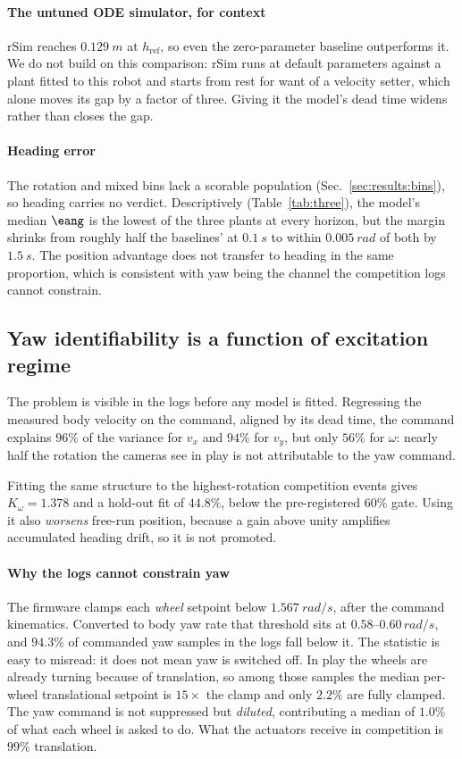 \paragraph{The untuned ODE simulator, for context}
rSim reaches $\SI{0.129}{m}$ at $h_{\mathrm{ref}}$, so even the zero-parameter
baseline outperforms it. We do not build on this comparison: rSim runs at
default parameters against a plant fitted to this robot and starts from rest for
want of a velocity setter, which alone moves its gap by a factor of three.
Giving it the model's dead time widens rather than closes the gap.

\paragraph{Heading error}
The rotation and mixed bins lack a scorable population
(Sec.~\ref{sec:results:bins}), so heading carries no verdict. Descriptively
(Table~\ref{tab:three}), the model's median $\eang$ is the lowest of the three
plants at every horizon, but the margin shrinks from roughly half the
baselines' at $\SI{0.1}{s}$ to within $\SI{0.005}{rad}$ of both by
$\SI{1.5}{s}$. The position advantage does not transfer to heading in the same
proportion, which is consistent with yaw being the channel the competition logs
cannot constrain.

\subsection{Yaw identifiability is a function of excitation regime}
\label{sec:results:omega}

The problem is visible in the logs before any model is fitted. Regressing the
measured body velocity on the command, aligned by its dead time, the command
explains $96\%$ of the variance for $v_x$ and $94\%$ for $v_y$, but only $56\%$
for $\omega$: nearly half the rotation the cameras see in play is not
attributable to the yaw command.

Fitting the same structure to the highest-rotation competition events gives
$K_\omega = 1.378$ and a hold-out fit of $44.8\%$, below the pre-registered
$60\%$ gate. Using it also \emph{worsens} free-run position, because a gain
above unity amplifies accumulated heading drift, so it is not promoted.

\paragraph{Why the logs cannot constrain yaw}
The firmware clamps each \emph{wheel} setpoint below $\SI{1.567}{rad/s}$, after
the command kinematics. Converted to body yaw rate that threshold sits at
$0.58$--$0.60\,\si{rad/s}$, and $94.3\%$ of commanded yaw samples in the logs
fall below it. The statistic is easy to misread: it does not mean yaw is
switched off. In play the wheels are already turning because of translation, so
among those samples the median per-wheel translational setpoint is $15\times$
the clamp and only $2.2\%$ are fully clamped. The yaw command is not suppressed
but \emph{diluted}, contributing a median of $1.0\%$ of what each wheel is asked
to do. What the actuators receive in competition is $99\%$ translation.

